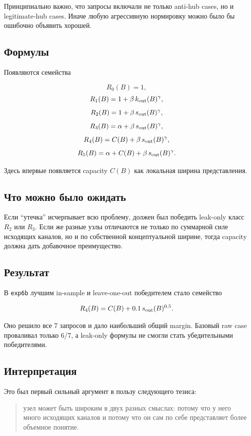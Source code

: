 Принципиально важно, что запросы включали не только anti-hub cases, но и
legitimate-hub cases. Иначе любую агрессивную нормировку можно было бы ошибочно
объявить хорошей.

\subsection{Формулы}

Появляются семейства

\[
R_0(B)=1,
\]
\[
R_1(B)=1+\beta\, k_{\mathrm{out}}(B)^\gamma,
\]
\[
R_2(B)=1+\beta\, s_{\mathrm{out}}(B)^\gamma,
\]
\[
R_3(B)=\alpha+\beta\, s_{\mathrm{out}}(B)^\gamma,
\]
\[
R_4(B)=C(B)+\beta\, s_{\mathrm{out}}(B)^\gamma,
\]
\[
R_5(B)=\alpha+C(B)+\beta\, s_{\mathrm{out}}(B)^\gamma.
\]

Здесь впервые появляется capacity $C(B)$ как локальная ширина представления.

\subsection{Что можно было ожидать}

Если ``утечка'' исчерпывает всю проблему, должен был победить leak-only класс
$R_2$ или $R_3$. Если же разные узлы отличаются не только по суммарной силе
исходящих каналов, но и по собственной концептуальной ширине, тогда capacity
должна дать добавочное преимущество.

\subsection{Результат}

В \texttt{exp6b} лучшим in-sample и leave-one-out победителем стало семейство

\[
R_4(B)=C(B)+0.1\, s_{\mathrm{out}}(B)^{0.5}.
\]

Оно решило все 7 запросов и дало наибольший общий margin. Базовый raw case
проваливал только 6/7, а leak-only формулы не смогли стать убедительными
победителями.

\subsection{Интерпретация}

Это был первый сильный аргумент в пользу следующего тезиса:

\begin{quote}
узел может быть широким в двух разных смыслах: потому что у него много исходящих
каналов и потому что он сам по себе представляет более объемное понятие.
\end{quote}

